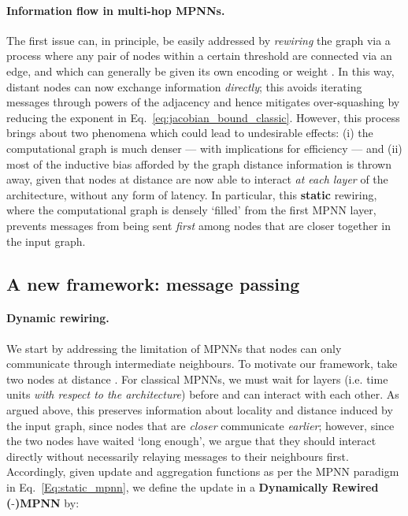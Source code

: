 \documentclass{article}
\theoremstyle{plain}
\theoremstyle{definition}
\theoremstyle{remark}
\begin{document}
\paragraph{Information flow in multi-hop MPNNs.} The first issue can, in principle, be easily addressed by {\em rewiring} the graph via a process where any pair of nodes within a certain threshold are connected via an edge, and which can generally be given its own encoding or weight \citep{abboud2022shortest, bruel2022rewiring, rampavsek2022recipe}.  In this way, distant nodes can now exchange information {\em directly}; this avoids iterating messages through powers of the adjacency and hence mitigates over-squashing by reducing the exponent in Eq.~\eqref{eq:jacobian_bound_classic}. However, this process brings about two phenomena which could lead to undesirable effects: (i) the computational graph is much denser --- with implications for efficiency --- and (ii) most of the inductive bias afforded by the graph distance information is thrown away, given that nodes  at distance  are now able to interact {\em at each layer} of the architecture, without any form of latency. In particular, this {\bf static} rewiring,
where the computational graph is densely `filled' from the first MPNN layer, prevents messages from being sent \emph{first} among nodes that are closer together in the input graph.





\subsection{A new framework:  message passing}

\paragraph{Dynamic rewiring.} We start by addressing the limitation of MPNNs that nodes can only communicate through intermediate neighbours. To motivate our framework, take two nodes  at distance . For classical MPNNs, we must wait for  layers (i.e. time units {\em with respect to the architecture}) before  and  can interact with each other. As argued above, this preserves information about locality and distance induced by the input graph, since nodes that are {\em closer} communicate {\em earlier}; however, since the two nodes have waited `long enough', we argue that they should interact directly without necessarily relaying messages to their neighbours first. Accordingly, given update and aggregation functions as per the MPNN paradigm in Eq.~\eqref{Eq:static_mpnn}, we define the update in a \textbf{Dynamically Rewired (}-\textbf{)MPNN} by:
\end{document}
